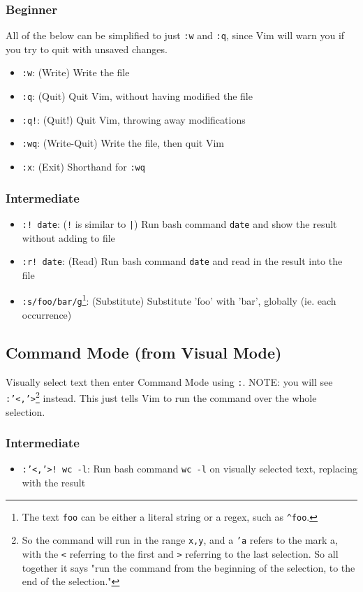 \documentclass[11pt]{article}
\begin{document}
\subsubsection{Beginner}
\label{sec:org9435730}
All of the below can be simplified to just \texttt{:w} and \texttt{:q}, since Vim will warn
you if you try to quit with unsaved changes.

\begin{itemize}
\item \texttt{:w}: (Write) Write the file
\item \texttt{:q}: (Quit) Quit Vim, without having modified the file
\item \texttt{:q!}: (Quit!) Quit Vim, throwing away modifications
\item \texttt{:wq}: (Write-Quit) Write the file, then quit Vim
\item \texttt{:x}: (Exit) Shorthand for \texttt{:wq}
\end{itemize}
\subsubsection{Intermediate}
\label{sec:org009fda0}
\begin{itemize}
\item \texttt{:! date}: (\texttt{!} is similar to \texttt{|}) Run bash command \texttt{date} and show the result without adding to file
\item \texttt{:r! date}: (Read) Run bash command \texttt{date} and read in the result into the file
\item \texttt{:s/foo/bar/g}\footnote{The text \texttt{foo} can be either a literal string or a regex, such as \texttt{\textasciicircum{}foo}.}: (Substitute) Substitute 'foo' with 'bar', globally (ie. each occurrence)
\end{itemize}
\subsection{Command Mode (from Visual Mode)}
\label{sec:org132b939}
Visually select text then enter Command Mode using \texttt{:}. NOTE: you will see
\texttt{:'<,'>}\footnote{So the command will run in the range \texttt{x,y}, and 
a \texttt{'a} refers to the mark a, with the \texttt{<} referring to the first and \texttt{>}
referring to the last selection. So all together it says "run the command from
the beginning of the selection, to the end of the selection."} instead. This just tells Vim to run the command over the whole
selection.
\subsubsection{Intermediate}
\label{sec:orgd06554e}
\begin{itemize}
\item \texttt{:'<,'>! wc -l}: Run bash command \texttt{wc -l} on visually selected text, replacing with the result
\end{itemize}
\end{document}
